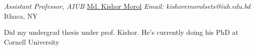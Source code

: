 

\begin{cventries}

  \cventry
    {\textit{Assistant Professor, AIUB }} %
    {\href{https://cs.aiub.edu/profile/kishor}{Md. Kishor Morol} {\hspace{0.5em} \textcolor{greytext}{\fontsize{8}{10}\textnormal{{\textit{Email: kishoremorolsets@iub.edu.bd}}}}}} %
    {Ithaca, NY} %
    {} %
    {
      \begin{cvitems} %
        \item {Did my undergrad thesis under prof. Kishor. He's currently doing his PhD at Cornell University}
      \end{cvitems}}
\end{cventries}
